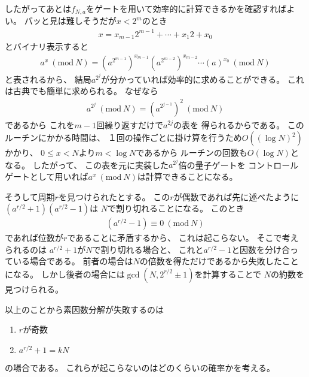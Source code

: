 \documentclass[a4paper, 10pt]{jsarticle}
\begin{document}
したがってあとは$f_{N, a}$をゲートを用いて効率的に計算できるかを確認すればよい。
パッと見は難しそうだが$x < 2^m$のとき
\begin{align}
	x = x_{m-1} 2^{m-1} + \cdots + x_1 2 + x_0
\end{align}
とバイナリ表示すると
\begin{align}
	a^x \ (\mathrm{mod} \ N)
	= \left( a^{2^{m-1}} \right)^{x_{m-1}} \left( a^{2^{m-2}} \right)^{x_{m-2}}
	\cdots \left( a \right)^{x_0} \ (\mathrm{mod} \ N)
\end{align}
と表されるから、
結局$a^{2^j}$が分かっていれば効率的に求めることができる。
これは古典でも簡単に求められる。
なぜなら
\begin{align}
	a^{2^j} \ (\mathrm{mod} \ N) = \left( a^{2^{j-1}} \right)^2 \
	(\mathrm{mod} \ N)
\end{align}
であるから
これを$m-1$回繰り返すだけで$a^{2j}$の表を
得られるからである。
このルーチンにかかる時間は、
１回の操作ごとに掛け算を行うため$O ((\log N)^2)$かかり、
$0 \leq x < N$より$m < \log N$であるから
ルーチンの回数も$O (\log N)$となる。
したがって、
この表を元に実装した$a^{2^j}$倍の量子ゲートを
コントロールゲートとして用いれば$a^x\ (\mathrm{mod}\ N)$は計算できることになる。

そうして周期$r$を見つけられたとする。
この$r$が偶数であれば先に述べたように
$\left( a^{r/2} + 1 \right) \left( a^{r/2} - 1 \right)$は
$N$で割り切れることになる。
このとき
\begin{align}
	\left( a^{r/2} - 1 \right) \equiv 0 \ (\mathrm{mod} \ N)
\end{align}
であれば位数が$r$であることに矛盾するから、
これは起こらない。
そこで考えられるのは
$a^{r/2} + 1$が$N$で割り切れる場合と、
これと$a^{r/2} - 1$と因数を分け合っている場合である。
前者の場合は$N$の倍数を得ただけであるから失敗したことになる。
しかし後者の場合には$\gcd (N, 2^{r/2} \pm 1)$を計算することで
$N$の約数を見つけられる。

以上のことから素因数分解が失敗するのは
\begin{enumerate}
	\item $r$が奇数
	\item $a^{r/2} + 1 = kN$
\end{enumerate}
の場合である。
これらが起こらないのはどのくらいの確率かを考える。
\end{document}
